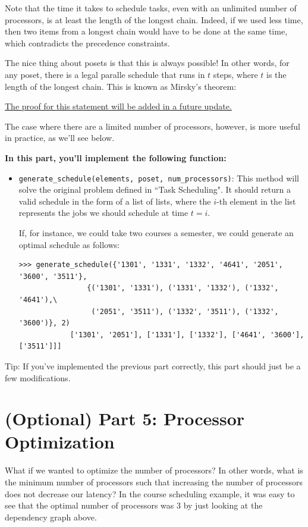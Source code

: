 \documentclass{article}
\begin{document}
    Note that the time it takes to schedule tasks, even with an unlimited number of processors, is at least the length of the longest chain. Indeed, if we used less time, then two items from a longest chain would have to be done at the same time, which contradicts the precedence constraints. 


    \vspace{2mm}
    The nice thing about posets is that this is always possible! In other words, for any poset, there is a legal paralle schedule that runs in $t$ steps, where $t$ is the length of the longest chain. This is known as Mirsky's theorem:
    
    \underline{The proof for this statement will be added in a future update.}

    \vspace{2mm}    
    The case where there are a limited number of processors, however, is more useful in practice, as we'll see below.

    \begin{tcolorbox}[colback=yellow!30]
        \textbf{In this part, you'll implement the following function:}
        \begin{itemize}
            \item \lstinline{generate_schedule(elements, poset, num_processors)}:  This method will solve the original problem defined in ``Task Scheduling". It should return a valid schedule in the form of a list of lists, where the $i$-th element in the list represents the jobs we should schedule at time $t = i$.

        If, for instance, we could take two courses a semester, we could generate an optimal schedule as follows:
    \begin{lstlisting}[belowskip=-10pt]
        >>> generate_schedule({'1301', '1331', '1332', '4641', '2051', '3600', '3511'},
                {('1301', '1331'), ('1331', '1332'), ('1332', '4641'),\
                 ('2051', '3511'), ('1332', '3511'), ('1332', '3600')}, 2)
            ['1301', '2051'], ['1331'], ['1332'], ['4641', '3600'], ['3511']]]
    \end{lstlisting}
        \end{itemize}
        Tip: If you've implemented the previous part correctly, this part should just be a few modifications.
        
    \end{tcolorbox}



    \section*{(Optional) Part 5: Processor Optimization}
    What if we wanted to optimize the number of processors? In other words, what is the minimum number of processors such that increasing the number of processors does not decrease our latency? In the course scheduling example, it was easy to see that the optimal number of processors was $3$ by just looking at the dependency graph above. 
    
\end{document}
